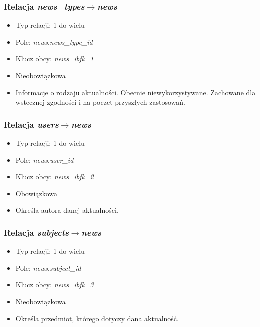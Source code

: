 \documentclass[a4paper,12pt,oneside]{report}
\begin{document}
\subsubsection{Relacja \emph{news\_types}$\to$\emph{news}}
\label{subsub:news_types-news}
\begin{itemize}
  \item Typ relacji: 1 do wielu
  \item Pole: \emph{news}.\emph{news\_type\_id}
  \item Klucz obcy: \emph{news\_ibfk\_1}
  \item Nieobowiązkowa
  \item Informacje o rodzaju aktualności. Obecnie niewykorzystywane. Zachowane dla wstecznej zgodności i na poczet przyszłych zastosowań.
\end{itemize}

\subsubsection{Relacja \emph{users}$\to$\emph{news}}
\label{subsub:users-news}
\begin{itemize}
  \item Typ relacji: 1 do wielu
  \item Pole: \emph{news}.\emph{user\_id}
  \item Klucz obcy: \emph{news\_ibfk\_2}
  \item Obowiązkowa
  \item Określa autora danej aktualności.
\end{itemize}

\subsubsection{Relacja \emph{subjects}$\to$\emph{news}}
\label{subsub:subjects-news}
\begin{itemize}
  \item Typ relacji: 1 do wielu
  \item Pole: \emph{news}.\emph{subject\_id}
  \item Klucz obcy: \emph{news\_ibfk\_3}
  \item Nieobowiązkowa
  \item Określa przedmiot, którego dotyczy dana aktualność.
\end{itemize}
\end{document}

